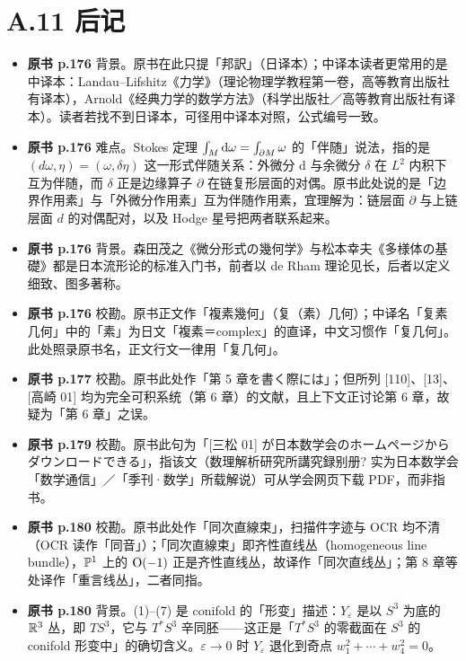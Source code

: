 \section*{A.11 后记}
\begin{itemize}[leftmargin=2.4em,itemsep=4pt,label={\textbullet}]
\item \textbf{原书 p.176} 背景。原书在此只提「邦訳」（日译本）；中译本读者更常用的是中译本：Landau–Lifshitz《力学》（理论物理学教程第一卷，高等教育出版社有译本），Arnold《经典力学的数学方法》（科学出版社／高等教育出版社有译本）。读者若找不到日译本，可径用中译本对照，公式编号一致。
\item \textbf{原书 p.176} 难点。Stokes 定理 $\int_M \mathrm{d}\omega = \int_{\partial M}\omega$ 的「伴随」说法，指的是 $(d\omega, \eta) = (\omega, \delta\eta)$ 这一形式伴随关系：外微分 d 与余微分 $\delta$ 在 $L^2$ 内积下互为伴随，而 $\delta$ 正是边缘算子 $\partial$ 在链复形层面的对偶。原书此处说的是「边界作用素」与「外微分作用素」互为伴随作用素，宜理解为：链层面 $\partial$ 与上链层面 $d$ 的对偶配对，以及 Hodge 星号把两者联系起来。
\item \textbf{原书 p.176} 背景。森田茂之《微分形式の幾何学》与松本幸夫《多様体の基礎》都是日本流形论的标准入门书，前者以 de Rham 理论见长，后者以定义细致、图多著称。
\item \textbf{原书 p.176} 校勘。原书正文作「複素幾何」（复（素）几何）；中译名「复素几何」中的「素」为日文「複素＝complex」的直译，中文习惯作「复几何」。此处照录原书名，正文行文一律用「复几何」。
\item \textbf{原书 p.177} 校勘。原书此处作「第 5 章を書く際には」；但所列 [110]、[13]、[高崎 01] 均为完全可积系统（第 6 章）的文献，且上下文正讨论第 6 章，故疑为「第 6 章」之误。
\item \textbf{原书 p.179} 校勘。原书此句为「[三松 01] が日本数学会のホームページからダウンロードできる」，指该文（数理解析研究所講究録别册? 实为日本数学会「数学通信」／「季刊·数学」所载解说）可从学会网页下载 PDF，而非指书。
\item \textbf{原书 p.180} 校勘。原书此处作「同次直線束」，扫描件字迹与 OCR 均不清（OCR 读作「同音」）；「同次直線束」即齐性直线丛（homogeneous line bundle），$\mathbb{P}^1$ 上的 $\operatorname{O}(-1)$ 正是齐性直线丛，故译作「同次直线丛」；第 8 章等处译作「重言线丛」，二者同指。
\item \textbf{原书 p.180} 背景。(1)–(7) 是 conifold 的「形变」描述：$Y_\varepsilon$ 是以 $S^3$ 为底的 $\mathbb{R}^3$ 丛，即 $TS^3$，它与 $T^*S^3$ 辛同胚——这正是「$T^*S^3$ 的零截面在 $S^3$ 的 conifold 形变中」的确切含义。$\varepsilon\to0$ 时 $Y_\varepsilon$ 退化到奇点 $w_1^2+\cdots+w_4^2=0$。

\end{itemize}
